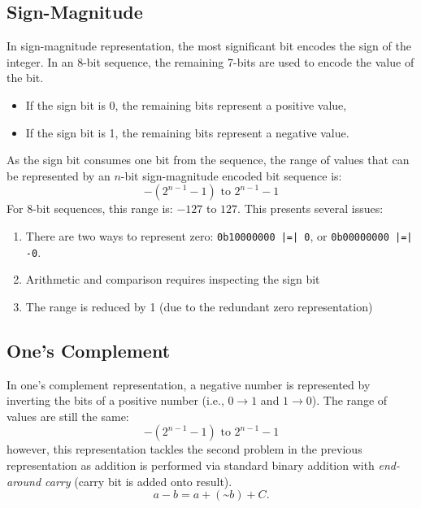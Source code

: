 \documentclass{report}
\begin{document}
\subsection{Sign-Magnitude}
In sign-magnitude representation, the most significant bit encodes the sign of the
integer. In an 8-bit sequence, the remaining 7-bits are used to
encode the value of the bit.
\begin{itemize}
    \item If the sign bit is 0, the remaining bits represent a positive value,
    \item If the sign bit is 1, the remaining bits represent a negative value.
\end{itemize}
As the sign bit consumes one bit from the sequence, the range of values that can be
represented by an \(n\)-bit sign-magnitude encoded bit sequence is:
\begin{equation*}
    -\left( 2^{n - 1} - 1 \right) \text{ to } 2^{n - 1} - 1
\end{equation*}
For 8-bit sequences, this range is: \(-127\) to \(127\).
This presents several issues:
\begin{enumerate}
    \item There are two ways to represent zero: \texttt{0b10000000 |=| 0}, or \texttt{0b00000000 |=| -0}.
    \item Arithmetic and comparison requires inspecting the sign bit
    \item The range is reduced by 1 (due to the redundant zero representation)
\end{enumerate}
\subsection{One's Complement}
In one's complement representation, a negative number is represented by
inverting the bits of a positive number (i.e., \(0 \to 1\) and \(1 \to 0\)).
The range of values are still the same:
\begin{equation*}
    -\left( 2^{n - 1} - 1 \right) \text{ to } 2^{n - 1} - 1
\end{equation*}
however, this representation tackles the second problem in the previous representation as
addition is performed via standard binary addition with \textit{end-around carry} (carry bit is added onto result).
\begin{equation*}
    a - b = a + \left( \text{\textasciitilde} b \right) + C.
\end{equation*}
\end{document}
